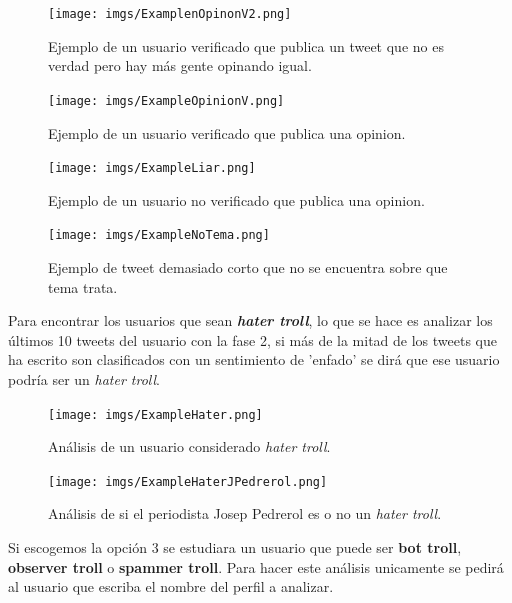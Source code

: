 \documentclass[../all.tex]{subfiles}
\begin{document}
	\begin{figure}[H]
		\centering
		\texttt{[image: imgs/ExamplenOpinonV2.png]}
		\caption{Ejemplo de un usuario verificado que publica un tweet que no es verdad pero hay más gente opinando igual.}
	\end{figure}
	
	\begin{figure}[H]
		\centering
		\texttt{[image: imgs/ExampleOpinionV.png]}
		\caption{Ejemplo de un usuario verificado que publica una opinion.}
	\end{figure}
	
	\begin{figure}[H]
		\centering
		\texttt{[image: imgs/ExampleLiar.png]}
		\caption{Ejemplo de un usuario no verificado que publica una opinion.}
	\end{figure}
		
	\begin{figure}[H]
		\centering
		\texttt{[image: imgs/ExampleNoTema.png]}
		\caption{Ejemplo de tweet demasiado corto que no se encuentra sobre que tema trata.}
	\end{figure}


	Para encontrar los usuarios que sean \textbf{\textit{hater troll}}, lo que se hace es analizar los últimos 10 tweets del usuario con la fase 2, si más de la mitad de los tweets que ha escrito son clasificados con un sentimiento de 'enfado'  se dirá que ese usuario podría ser un \textit{hater troll}.
	\begin{figure}[H]
		\centering
		\texttt{[image: imgs/ExampleHater.png]}
		\caption{Análisis de un usuario considerado \textit{hater troll}.}
	\end{figure}
	\begin{figure}[H]
		\centering
		\texttt{[image: imgs/ExampleHaterJPedrerol.png]}
		\caption{Análisis de si el periodista Josep Pedrerol es o no un \textit{hater troll}.}
	\end{figure}

	Si escogemos la opción 3 se estudiara un usuario que puede ser \textbf{bot troll}, \textbf{observer troll} o \textbf{spammer troll}. Para hacer este análisis unicamente se pedirá al usuario que escriba el nombre del perfil a analizar.\\
	
\end{document}
